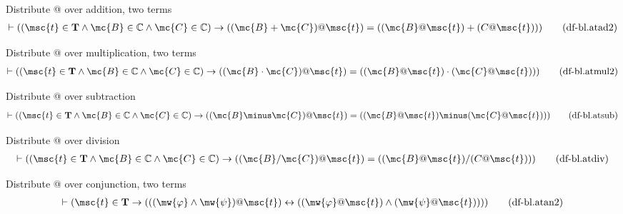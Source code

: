 \begin{metadefinition} {Distribute @ over addition, two
terms}
\begin{align}
\vdash ( ( \msc{t} \in \mathbf{T} \wedge \mc{B} \in \mathbb{C} \wedge \mc{C} \in
    \mathbb{C} ) \rightarrow ( ( \mc{B} + \mc{C} ) @ \msc{t} ) = ( ( \mc{B} @ \msc{t} ) + ( C
    @ \msc{t} ) ) )\label{eq:df-bl.atad2}\tag{df-bl.atad2}
\end{align}
\end{metadefinition}


\begin{metadefinition} {Distribute @ over multiplication,
two terms}
\begin{align}
\vdash ( ( \msc{t} \in \mathbf{T} \wedge \mc{B} \in \mathbb{C} \wedge \mc{C} \in
    \mathbb{C} ) \rightarrow ( ( \mc{B} \cdot \mc{C} ) @ \msc{t} ) = ( ( \mc{B} @ \msc{t} )
    \cdot ( \mc{C} @ \msc{t} ) ) )\label{eq:df-bl.atmul2}\tag{df-bl.atmul2}
\end{align}
\end{metadefinition}


\begin{metadefinition} {Distribute @ over subtraction}
\begin{align}
\vdash ( ( \msc{t} \in \mathbf{T} \wedge \mc{B} \in \mathbb{C} \wedge \mc{C} \in
    \mathbb{C} ) \rightarrow ( ( \mc{B} \minus \mc{C} ) @ \msc{t} ) = ( ( \mc{B} @ \msc{t} )
    \minus ( \mc{C} @ \msc{t} ) ) )\label{eq:df-bl.atsub}\tag{df-bl.atsub}
\end{align}
\end{metadefinition}


\begin{metadefinition} {Distribute @ over division}
\begin{align}
\vdash ( ( \msc{t} \in \mathbf{T} \wedge \mc{B} \in \mathbb{C} \wedge \mc{C} \in
    \mathbb{C} ) \rightarrow ( ( \mc{B} / \mc{C} ) @ \msc{t} ) = ( ( \mc{B} @ \msc{t} ) / ( C
    @ \msc{t} ) ) )\label{eq:df-bl.atdiv}\tag{df-bl.atdiv}
\end{align}
\end{metadefinition}


\begin{metadefinition} {Distribute @ over conjunction, two
terms}
\begin{align}
\vdash ( \msc{t} \in \mathbf{T} \rightarrow ( ( ( \mw{\varphi} \wedge \mw{\psi}
    ) @ \msc{t} ) \leftrightarrow ( ( \mw{\varphi} @ \msc{t} ) \wedge (
    \mw{\psi} @ \msc{t} ) ) ) )\label{eq:df-bl.atan2}\tag{df-bl.atan2}
\end{align}
\end{metadefinition}


